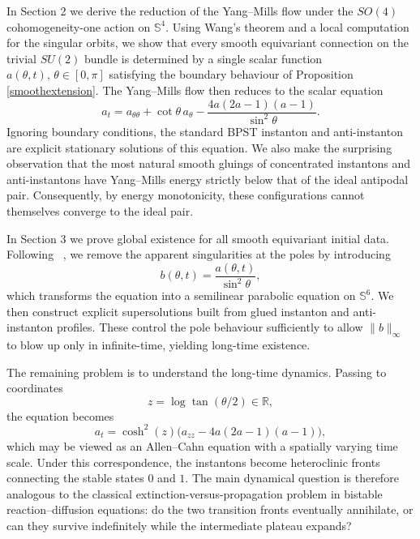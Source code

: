 \documentclass[11pt,a4paper]{article}
\numberwithin{equation}{section}
\theoremstyle{plain}
\theoremstyle{remark}
\begin{document}
In Section 2 we derive the reduction of the Yang--Mills flow under the $SO(4)$ cohomogeneity-one action on $\mathbb{S}^4$. Using Wang's theorem \cite{Wang1958} and a local computation for the singular orbits, we show that every smooth equivariant connection on the trivial $SU(2)$ bundle is determined by a single scalar function $a(\theta,t),\,\theta\in[0,\pi]$ satisfying the boundary behaviour of Proposition \ref{smoothextension}. The Yang--Mills flow then reduces to the scalar equation
$$
a_t
=
a_{\theta\theta}
+
\cot\theta\, a_\theta
-
\frac{4a(2a-1)(a-1)}{\sin^2\theta}.
$$
Ignoring boundary conditions, the standard BPST instanton and anti-instanton are explicit stationary solutions of this equation. We also make the surprising observation that the most natural smooth gluings of concentrated instantons and anti-instantons have Yang–Mills energy strictly below that of the ideal antipodal pair. Consequently, by energy monotonicity, these configurations cannot themselves converge to the ideal pair.

In Section 3 we prove global existence for all smooth equivariant initial data. Following ~\cite{67fa8f92-32f2-39c3-bd3f-c407da60a7c7,Waldron2014Thesis}, we remove the apparent singularities at the poles by introducing
$$
b(\theta,t)=\frac{a(\theta,t)}{\sin^2\theta},
$$
which transforms the equation into a semilinear parabolic equation on $\mathbb{S}^6$. We then construct explicit supersolutions built from glued instanton and anti-instanton profiles. These control the pole behaviour sufficiently to allow $\|b\|_\infty$ to blow up only in infinite-time, yielding long-time existence.

The remaining problem is to understand the long-time dynamics. Passing to coordinates
$$
z=\log\tan(\theta/2)\in\mathbb{R},
$$
the equation becomes
\begin{equation}\label{coshAC}
a_t=\cosh^2(z)\bigl(a_{zz}-4a(2a-1)(a-1)\bigr),
\end{equation}
which may be viewed as an Allen–Cahn equation with a spatially varying time scale. Under this correspondence, the instantons become heteroclinic fronts connecting the stable states $0$ and $1$. The main dynamical question is therefore analogous to the classical extinction-versus-propagation problem in bistable reaction–diffusion equations: do the two transition fronts eventually annihilate, or can they survive indefinitely while the intermediate plateau expands?
\end{document}
